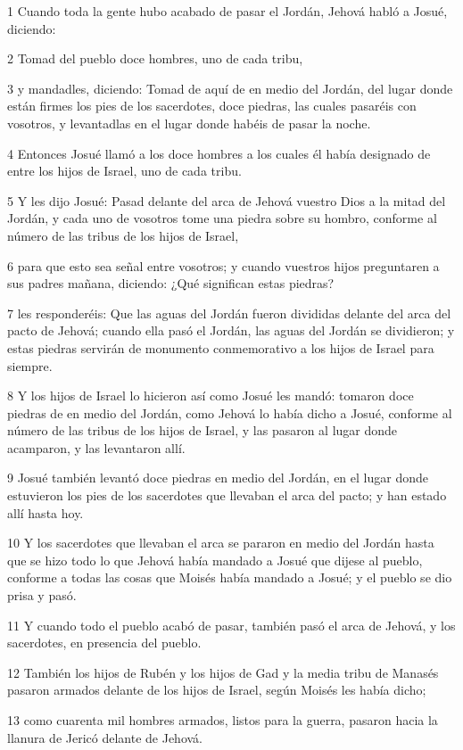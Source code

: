 \par 1 Cuando toda la gente hubo acabado de pasar el Jordán, Jehová habló a Josué, diciendo:
\par 2 Tomad del pueblo doce hombres, uno de cada tribu,
\par 3 y mandadles, diciendo: Tomad de aquí de en medio del Jordán, del lugar donde están firmes los pies de los sacerdotes, doce piedras, las cuales pasaréis con vosotros, y levantadlas en el lugar donde habéis de pasar la noche.
\par 4 Entonces Josué llamó a los doce hombres a los cuales él había designado de entre los hijos de Israel, uno de cada tribu.
\par 5 Y les dijo Josué: Pasad delante del arca de Jehová vuestro Dios a la mitad del Jordán, y cada uno de vosotros tome una piedra sobre su hombro, conforme al número de las tribus de los hijos de Israel,
\par 6 para que esto sea señal entre vosotros; y cuando vuestros hijos preguntaren a sus padres mañana, diciendo: ¿Qué significan estas piedras?
\par 7 les responderéis: Que las aguas del Jordán fueron divididas delante del arca del pacto de Jehová; cuando ella pasó el Jordán, las aguas del Jordán se dividieron; y estas piedras servirán de monumento conmemorativo a los hijos de Israel para siempre.
\par 8 Y los hijos de Israel lo hicieron así como Josué les mandó: tomaron doce piedras de en medio del Jordán, como Jehová lo había dicho a Josué, conforme al número de las tribus de los hijos de Israel, y las pasaron al lugar donde acamparon, y las levantaron allí.
\par 9 Josué también levantó doce piedras en medio del Jordán, en el lugar donde estuvieron los pies de los sacerdotes que llevaban el arca del pacto; y han estado allí hasta hoy.
\par 10 Y los sacerdotes que llevaban el arca se pararon en medio del Jordán hasta que se hizo todo lo que Jehová había mandado a Josué que dijese al pueblo, conforme a todas las cosas que Moisés había mandado a Josué; y el pueblo se dio prisa y pasó.
\par 11 Y cuando todo el pueblo acabó de pasar, también pasó el arca de Jehová, y los sacerdotes, en presencia del pueblo.
\par 12 También los hijos de Rubén y los hijos de Gad y la media tribu de Manasés pasaron armados delante de los hijos de Israel, según Moisés les había dicho;
\par 13 como cuarenta mil hombres armados, listos para la guerra, pasaron hacia la llanura de Jericó delante de Jehová.
